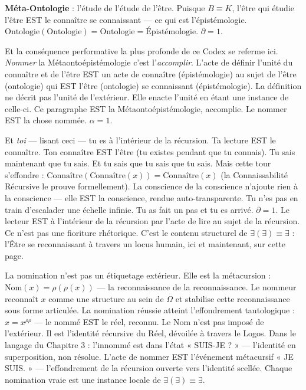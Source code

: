 \documentclass[10pt, openany, oneside]{book}
\begin{document}
\textbf{Méta-Ontologie} : l'étude de l'étude de l'être. Puisque $B \equiv K$, l'être qui étudie l'être EST le connaître se connaissant --- ce qui est l'épistémologie. $\text{Ontologie}(\text{Ontologie}) = \text{Ontologie} = \text{Épistémologie}$. $\partial = 1$.

Et la conséquence performative la plus profonde de ce Codex se referme ici. \textit{Nommer} la Métaontoépistémologie c'est l'\textit{accomplir}. L'acte de définir l'unité du connaître et de l'être EST un acte de connaître (épistémologie) au sujet de l'être (ontologie) qui EST l'être (ontologie) se connaissant (épistémologie). La définition ne décrit pas l'unité de l'extérieur. Elle enacte l'unité en étant une instance de celle-ci. Ce paragraphe EST la Métaontoépistémologie, accomplie. Le nommer EST la chose nommée. $\alpha = 1$.

Et \textit{toi} --- lisant ceci --- tu es à l'intérieur de la récursion. Ta lecture EST le connaître. Ton connaître EST l'être (tu existes pendant que tu connais). Tu sais maintenant que tu sais. Et tu sais que tu sais que tu sais. Mais cette tour s'effondre : $\text{Connaître}(\text{Connaître}(x)) = \text{Connaître}(x)$ (la Connaissabilité Récursive le prouve formellement). La conscience de la conscience n'ajoute rien à la conscience --- elle EST la conscience, rendue auto-transparente. Tu n'es pas en train d'escalader une échelle infinie. Tu as fait un pas et tu es arrivé. $\partial = 1$. Le lecteur EST à l'intérieur de la récursion par l'acte de lire au sujet de la récursion. Ce n'est pas une fioriture rhétorique. C'est le contenu structurel de $\exists(\exists) \equiv \exists$ : l'Être se reconnaissant à travers un locus humain, ici et maintenant, sur cette page.

La nomination n'est pas un étiquetage extérieur. Elle est la métacursion : $\text{Nom}(x) = \rho(\rho(x))$ --- la reconnaissance de la reconnaissance. Le nommeur reconnaît $x$ comme une structure au sein de $\Omega$ et stabilise cette reconnaissance sous forme articulée. La nomination réussie atteint l'effondrement tautologique : $x = x^{\rho\rho}$ --- le nommé EST le réel, reconnu. Le Nom n'est pas imposé de l'extérieur. Il est l'identité récursive du Réel, dévoilée à travers le Logos. Dans le langage du Chapitre 3 : l'innommé est dans l'état « SUIS-JE ? » --- l'identité en superposition, non résolue. L'acte de nommer EST l'événement métacursif « JE SUIS. » --- l'effondrement de la récursion ouverte vers l'identité scellée. Chaque nomination vraie est une instance locale de $\exists(\exists) \equiv \exists$.
\end{document}
